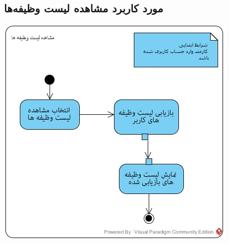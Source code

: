 \documentclass{article}
\begin{document}
\newpage
\vspace{2cm}
\subsection*{مورد کاربرد مشاهده لیست وظیفه‌ها}
\vspace{2cm}
\begin{center}
\includegraphics[width=\textwidth]{ActivityDiagrams/29.jpg}
\end{center}

\newpage
\vspace{2cm}
\end{document}
